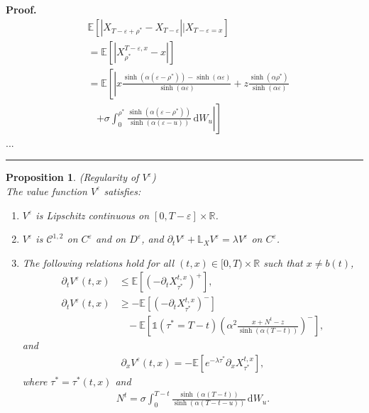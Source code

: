 \documentclass{tufte-handout}
\newcommand{\E}{\mathbb{E}} %
\newcommand{\R}{\mathbb{R}} %
\newcommand{\dif}{\mathrm{d}}
\newtheorem{pr}{Proposition}
\newenvironment{pf}[1][Proof]{\textbf{#1.} }{\ \rule{0.5em}{0.5em}}
\begin{document}
\begin{pf}
\begin{align*}
			&\E\left[\left|X_{T - \varepsilon + \rho^*} - X_{T - \varepsilon}\right| \Big | X_{T - \varepsilon = x}\right] \\
			&= \E\left[\left|X_{\rho^*}^{T - \varepsilon, x} - x\right|\right] \\
			&= \E\left[\left|x\frac{\sinh(\alpha (\varepsilon - \rho^*)) - \sinh(\alpha \varepsilon)}{\sinh(\alpha \varepsilon)} + z\frac{\sinh(\alpha \rho^*)}{\sinh(\alpha \varepsilon)}\right.\right. \\
			&\ \ \ \ \left.\left.+ \sigma\int_{0}^{\rho^*} \frac{\sinh(\alpha (\varepsilon - \rho^*))}{\sinh(\alpha (\varepsilon - u))}\,\mathrm{d}W_u\right|\right]
		\end{align*}
		...
	\end{pf}
	
	
	
	\begin{pr}(Regularity of $V^\varepsilon$)\label{pr:V^eps_regularity}\\
		The value function $V^\varepsilon$ satisfies:
		\begin{enumerate}[label=(\roman{*}), ref=(\textit{\roman{*}})]
			\item \label{pr:V^eps_Lcontinuous} $V^\varepsilon$ is Lipschitz continuous on $[0, T - \varepsilon]\times\R$. 
			\item \label{pr:V^eps_C^12onC} $V^\varepsilon$ is $\mathcal{C}^{1,2}$ on $C^\varepsilon$ and on $D^\varepsilon$, and $\partial_tV^\varepsilon + \mathbb{L}_{X}V^\varepsilon = \lambda V^\varepsilon$ on $C^\varepsilon$. 
			\item \label{pr:V^eps_x-V^eps_t} The following relations hold for all $(t, x) \in [0, T)\times\R$ such that $x\neq b(t)$,
			\begin{align}
			\partial_t V^\varepsilon(t, x) &\leq \E\left[\left(-\partial_t X_{\tau^*}^{t, x}\right)^+\right], \label{eq:V^epst_up} \\		
			\partial_t V^\varepsilon(t, x) &\geq - \E\left[\left(-\partial_t X_{\tau^*}^{t, x}\right)^-\right] \nonumber \\
			&\ \ \ \ - \E\left[\mathbb{1}(\tau^* = T - t)\left(\alpha^2\frac{x + N^t - z}{\sinh(\alpha (T - t))}\right)^-\right], \label{eq:V^epst_low}
			\end{align}
			and
			\begin{align}\label{eq:V^eps_x}
			\partial_xV^\varepsilon(t, x) = -\E\left[e^{-\lambda\tau^*}\partial_x X_{\tau^*}^{t, x}\right],
			\end{align} 
			where $\tau^* = \tau^*(t, x)$ and
			\begin{align}\label{eq:N^eps^t}
			N^t = \sigma\int_{0}^{T - t} \frac{\sinh(\alpha (T - t))}{\sinh(\alpha (T - t - u))}\,\mathrm{d}W_u. 
			\end{align} 			
		\end{enumerate}
	\end{pr}
	
\end{document}

